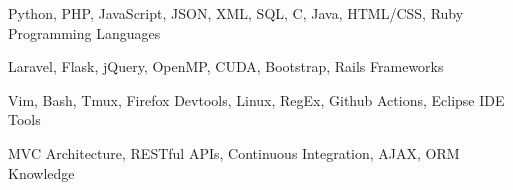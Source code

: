 

\begin{cventries}

\begin{minipage}[c]{0.5\textwidth}
  \cventry %
    {
        Python,
        PHP,
        JavaScript,
        JSON,
        XML,
        SQL,
        C,
        Java,
        HTML/CSS,
        Ruby
    } 
    {Programming Languages} %
    {} %
    {} %
    {}

  \cventry %
    {
        Laravel,
        Flask,
        jQuery,
        OpenMP,
        CUDA,
        Bootstrap,
        Rails
    }
    {Frameworks} %
    {} %
    {} %
    {}

 \end{minipage}\begin{minipage}[c]{0.5\textwidth}        
  \cventry
    {
        Vim,
        Bash,
        Tmux,
        Firefox Devtools,
        Linux,
        RegEx,
        Github Actions,
        Eclipse IDE
    }
    {Tools} %
    {} %
    {} %
    {}

  \cventry
    {
        MVC Architecture,
        RESTful APIs,
        Continuous Integration,
        AJAX,
        ORM
    }
    {Knowledge} %
    {} %
    {} %
    {}

\end{minipage}
\end{cventries}
